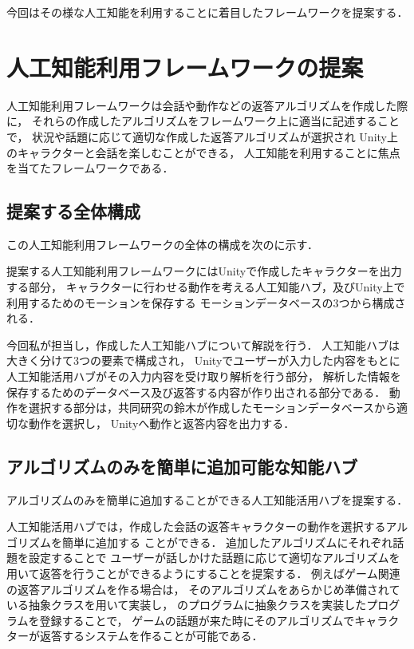 今回はその様な人工知能を利用することに着目したフレームワークを提案する．
\section{人工知能利用フレームワークの提案}
人工知能利用フレームワークは会話や動作などの返答アルゴリズムを作成した際に，
それらの作成したアルゴリズムをフレームワーク上に適当に記述することで，
状況や話題に応じて適切な作成した返答アルゴリズムが選択され
Unity上のキャラクターと会話を楽しむことができる，
人工知能を利用することに焦点を当てたフレームワークである．
\subsection{提案する全体構成}\label{sec:allAr}
この人工知能利用フレームワークの全体の構成を次のに示す．


提案する人工知能利用フレームワークにはUnityで作成したキャラクターを出力する部分，
キャラクターに行わせる動作を考える人工知能ハブ，及びUnity上で利用するためのモーションを保存する
モーションデータベースの3つから構成される．

今回私が担当し，作成した人工知能ハブについて解説を行う．
人工知能ハブは大きく分けて3つの要素で構成され，
Unityでユーザーが入力した内容をもとに人工知能活用ハブがその入力内容を受け取り解析を行う部分，
解析した情報を保存するためのデータベース及び返答する内容が作り出される部分である．
動作を選択する部分は，共同研究の鈴木が作成したモーションデータベースから適切な動作を選択し，
Unityへ動作と返答内容を出力する．

\subsection{アルゴリズムのみを簡単に追加可能な知能ハブ}
アルゴリズムのみを簡単に追加することができる人工知能活用ハブを提案する．

人工知能活用ハブでは，作成した会話の返答キャラクターの動作を選択するアルゴリズムを簡単に追加する
ことができる．
追加したアルゴリズムにそれぞれ話題を設定することで
ユーザーが話しかけた話題に応じて適切なアルゴリズムを用いて返答を行うことができるようにすることを提案する．
例えばゲーム関連の返答アルゴリズムを作る場合は，
そのアルゴリズムをあらかじめ準備されている抽象クラスを用いて実装し，
のプログラムに抽象クラスを実装したプログラムを登録することで，
ゲームの話題が来た時にそのアルゴリズムでキャラクターが返答するシステムを作ることが可能である．

